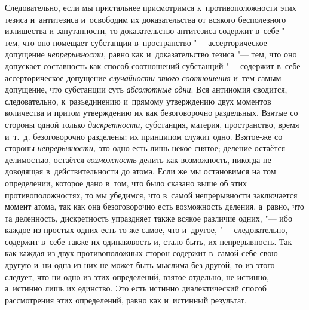 Следовательно, если мы пристальнее присмотримся к~противоположности этих тезиса
и~антитезиса и~освободим их доказательства от всякого бесполезного излишества и
запутанности, то доказательство антитезиса содержит в~себе "--- тем, что оно
помещает субстанции в~пространство "--- ассерторическое допущение
{\em непрерывности,} равно как и~доказательство тезиса "--- тем, что оно
допускает составность как способ соотношений субстанций "--- содержит в~себе
ассерторическое допущение {\em случайности этого соотношения} и~тем самым
допущение, что субстанции суть {\em абсолютные одни}. Вся антиномия сводится,
следовательно, к~разъединению и~прямому утверждению двух моментов количества и
притом утверждению их как безоговорочно раздельных. Взятые со стороны одной
только {\em дискретности,} субстанция, материя, пространство, время и~т.~д.
безоговорочно разделены; их принципом служит одно. Взятое-же со стороны
{\em непрерывности,} это одно есть лишь некое снятое; деление остаётся
делимостью, остаётся {\em возможность} делить как возможность, никогда не
доводящая в~действительности до атома. Если же мы остановимся на том
определении, которое дано в~том, что было сказано выше об этих
противоположностях, то мы убедимся, что в~самой непрерывности заключается
момент атома, так как она безоговорочно есть возможность деления, а~равно, что
та деленность, дискретность упраздняет также всякое различие одних, "--- ибо
каждое из простых одних есть то же самое, что и~другое, "--- следовательно,
содержит в~себе также их одинаковость и, стало быть, их непрерывность. Так как
каждая из двух противоположных сторон содержит в~самой себе свою другую и~ни
одна из них не может быть мыслима без другой, то из этого следует, что ни одно
из этих определений, взятое отдельно, не истинно, а~истинно лишь их единство.
Это есть истинно диалектический способ рассмотрения этих определений, равно как
и~истинный результат.

